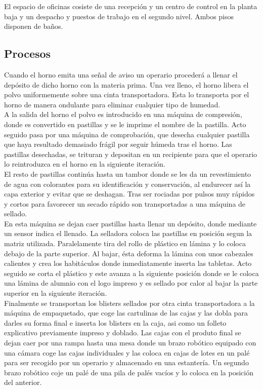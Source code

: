 El espacio de oficinas cosiste de una recepción y un centro de control en la planta baja y un despacho y puestos de trabajo en el segundo nivel. Ambos pisos disponen de baños.

\subsection{Procesos}
Cuando el horno emita una señal de aviso un operario procederá a llenar el depósito de dicho horno con la materia prima. Una vez lleno, el horno libera el polvo uniformemente sobre una cinta transportadora. Esta lo transporta por el horno de manera ondulante para eliminar cualquier tipo de humedad. 
\\

A la salida del horno el polvo es introducido en una máquina de compresión, donde es convertido en pastillas y se le imprime el nombre de la pastilla.  Acto seguido pasa por una máquina de comprobación, que desecha cualquier pastilla que haya resultado demasiado frágil por seguir húmeda tras el horno. Las pastillas desechadas, se trituran y depositan en un recipiente para que el operario lo reintroduzca en el horno en la siguiente iteración. 
\\

El resto de pastillas continúa hasta un tambor donde se les da un revestimiento de agua con colorantes para su identificación y conservación, al endurecer así la capa exterior y evitar que se deshagan. Tras ser rociadas por pulsos muy rápidos y cortos para favorecer un secado rápido son transportadas a una máquina de sellado.
\\

En esta máquina se dejan caer pastillas hasta llenar un depósito, donde mediante un sensor indica el llenado. La selladora coloca las pastillas en posición segun la matriz utilizada. Paralelamente tira del rollo de plástico en lámina y lo coloca debajo de la parte superior. Al bajar, ésta deforma la lámina con unos cabezales calientes y crea los habitáculos donde inmediatamente inserta las tabletas. Acto seguido se corta el plástico y este avanza a la siguiente posición donde se le coloca una lámina de alumnio con el logo impreso y es sellado por calor al bajar la parte superior en la siguiente iteración. 
\\

Finalmente se transportan los blisters sellados por otra cinta transportadora a la máquina de empaquetado, que coge las cartulinas de las cajas y las dobla para darles su forma final e inserta los blisters en la caja, asi como un folleto explicativo previamente impreso y doblado. Las cajas con el produto final se dejan caer por una rampa hasta una mesa donde un brazo robótico equipado con una cámara coge las cajas individuales y las coloca en cajas de lotes en un palé para ser recogido por un operario y almacenado en una estantería. Un segundo brazo robótico coje un palé de una pila de palés vacíos y lo coloca en la posición del anterior.
\\





